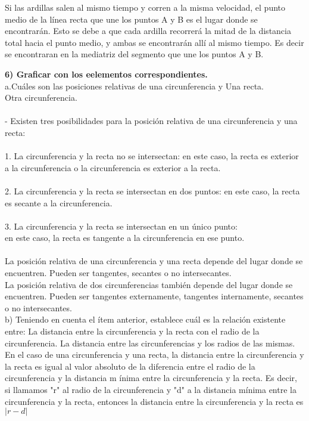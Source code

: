 \documentclass{article}
\begin{document}
Si las ardillas salen al mismo tiempo y corren a la misma velocidad, el punto medio de la línea recta que une los puntos A y B es el lugar donde se encontrarán. Esto se debe a que cada ardilla recorrerá la mitad de la distancia total hacia el punto medio, y ambas se encontrarán allí al mismo tiempo. Es decir se encontraran en la mediatriz del segmento que une los puntos A y B.

{\bf 6) Graficar con los eelementos correspondientes. } \\
a.Cuáles son las posiciones relativas de una circunferencia y Una recta.\\
Otra circunferencia.  \\
 \\
- Existen tres posibilidades para la posición relativa de una circunferencia y una recta: \\
 \\
1. La circunferencia y la recta no se intersectan: en este caso, la recta es exterior a la circunferencia o la circunferencia es exterior a la recta. \\
 \\
2. La circunferencia y la recta se intersectan en dos puntos: en este caso, la recta es secante a la circunferencia. \\
 \\
3. La circunferencia y la recta se intersectan en un único punto: \\
en este caso, la recta es tangente a la circunferencia en ese punto. \\
 \\
La posición relativa de una circunferencia y una recta depende del lugar donde se encuentren. Pueden ser tangentes, secantes o no intersecantes. \\

La posición relativa de dos circunferencias también depende del lugar donde se encuentren. Pueden ser tangentes externamente, tangentes internamente, secantes o no intersecantes. \\

b) Teniendo en cuenta el ítem anterior, establece cuál es la relación existente entre: La distancia entre la circunferencia y la recta con el radio de la circunferencia. La distancia entre las circunferencias y los radios de las mismas. \\

En el caso de una circunferencia y una recta, la distancia entre la circunferencia y la recta es igual al valor absoluto de
la diferencia entre el radio de la circunferencia y la distancia m
ínima entre la circunferencia y la recta. Es decir, si llamamos "r" al radio de la circunferencia y "d" a la distancia mínima entre
la circunferencia y la recta, entonces la distancia entre la circunferencia y la recta es $|r-d|$
\end{document}
